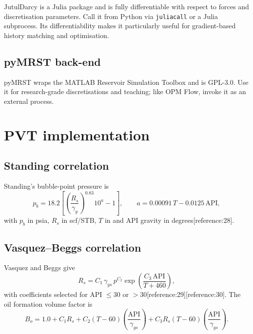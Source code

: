 \documentclass[10pt,a4paper]{article}
\newcommand{\bo}{B_o}
\newcommand{\rs}{R_s}
\begin{document}
JutulDarcy is a Julia package and is fully differentiable with respect to
forces and discretisation parameters. Call it from Python via
\texttt{juliacall} or a Julia subprocess. Its differentiability makes it
particularly useful for gradient-based history matching and optimisation.

\subsection{pyMRST back-end}

pyMRST wraps the MATLAB Reservoir Simulation Toolbox and is GPL-3.0. Use it for
research-grade discretisations and teaching; like OPM Flow, invoke it as an
external process.

\section{PVT implementation}

\subsection{Standing correlation}

Standing's bubble-point pressure is
\begin{equation}
  p_b = 18.2\left[\left(\frac{\rs}{\gamma_g}\right)^{0.83}10^{a}-1\right],
  \qquad
  a = 0.00091\,T - 0.0125\,\mathrm{API},
  \label{eq:standing}
\end{equation}
with $p_b$ in psia, $\rs$ in scf/STB, $T$ in \si{\fahrenheit} and API gravity
in degrees[reference:28].

\subsection{Vasquez--Beggs correlation}

Vasquez and Beggs give
\begin{equation}
  \rs = C_1\,\gamma_{gs}\,p^{C_2}\exp\!\left(\frac{C_3\,\mathrm{API}}{T+460}\right),
  \label{eq:vb-rs}
\end{equation}
with coefficients selected for API $\le 30$ or $>30$[reference:29][reference:30].
The oil formation volume factor is
\begin{equation}
  \bo = 1.0 + C_1\rs + C_2(T-60)\left(\frac{\mathrm{API}}{\gamma_{gs}}\right)
  + C_3\rs(T-60)\left(\frac{\mathrm{API}}{\gamma_{gs}}\right).
  \label{eq:vb-bo}
\end{equation}
\end{document}
